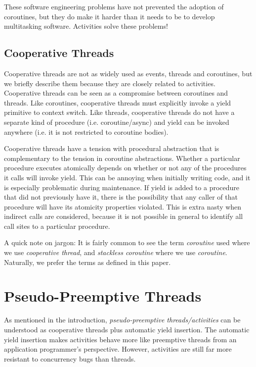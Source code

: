 \documentclass[10pt,preprint]{sigplanconf}
\begin{document}


These software engineering problems have not prevented the adoption of coroutines, but they do make it harder than it needs to be to develop multitasking software.
Activities solve these problems!

\subsection{Cooperative Threads}

Cooperative threads are not as widely used as events, threads and coroutines, but we briefly describe them because they are closely related to activities.
Cooperative threads can be seen as a compromise between coroutines and threads.
Like coroutines, cooperative threads must explicitly invoke a yield primitive to context switch.
Like threads, cooperative threads do not have a separate kind of procedure (i.e. coroutine/async) and yield can be invoked anywhere (i.e. it is not restricted to coroutine bodies).

Cooperative threads have a tension with procedural abstraction that is complementary to the tension in coroutine abstractions.
Whether a particular procedure executes atomically depends on whether or not any of the procedures it calls will invoke yield.
This can be annoying when initially writing code, and it is especially problematic during maintenance.
If yield is added to a procedure that did not previously have it, there is the possibility that any caller of that procedure will have its atomicity properties violated.
This is extra nasty when indirect calls are considered, because it is not possible in general to identify all call sites to a particular procedure.

A quick note on jargon: It is fairly common to see the term \emph{coroutine} used where we use \emph{cooperative thread}, and \emph{stackless coroutine} where we use \emph{coroutine}.
Naturally, we prefer the terms as defined in this paper.

\section{Pseudo-Preemptive Threads}

As mentioned in the introduction, \emph{pseudo-preemptive threads\slash activities} can be understood as cooperative threads plus automatic yield insertion.
The automatic yield insertion makes activities behave more like preemptive threads from an application programmer's perspective.
However, activities are still far more resistant to concurrency bugs than threads.
\end{document}
